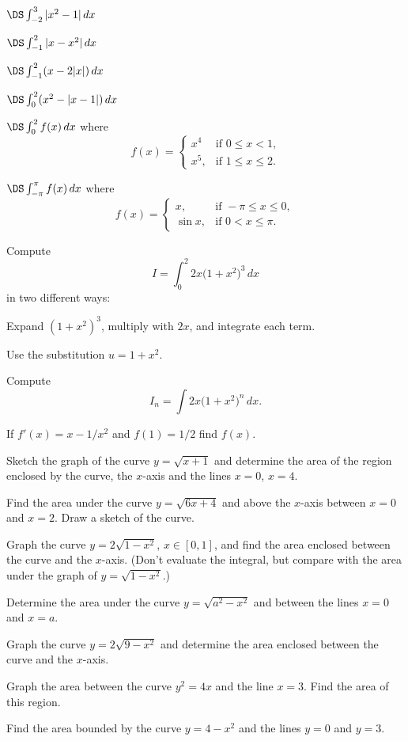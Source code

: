 \begin{multicols}{2}
\problem $\DS \int^3_{-2} |x^2-1| \,dx$

\problem $\DS \int^2_{-1} |x-x^2| \,dx$

\problem $\DS \int^2_{-1} (x-2|x|) \,dx$

\problem $\DS \int^2_{0} (x^2-|x-1|) \,dx$

\problem $\DS \int^2_{0} f(x) \,dx$ where 
\[
f(x) =
\begin{cases}
  x^4 &\text{if $0\le x<1$,}\\
  x^5,&\text{if $1\le x\le 2$}.
\end{cases}
\]

\problem $\DS \int^\pi_{-\pi} f(x) \,dx$ where
\[
f(x) =
\begin{cases}
  x, & \text{if }-\pi\le x\le 0,\\
  \sin x, &\text{if }0< x\le \pi.
\end{cases}
\]

\problem Compute
\[
I = \int _0^2 2x \bigl(1+x^2\bigr)^3\, dx
\]
in two different ways:

\subprob Expand $(1+x^2)^3$, multiply with $2x$, and integrate each term.

\subprob Use the substitution $u=1+x^2$.

\problem Compute
\[
I_n = \int 2x \bigl(1+x^2\bigr)^n\, dx.
\]

\problem If $f'(x)=x-1/x^2$ and $f(1)=1/2$ find $f(x)$.

\problem Sketch the graph of the curve $y=\sqrt{x+1}$ and determine the area of
the region enclosed by the curve, the $x$-axis and the lines $x=0$,
$x=4$.

\problem Find the area under the curve $y=\sqrt{6x+4}$ and above the $x$-axis
between $x=0$ and $x=2$.  Draw a sketch of the curve.

\problem Graph the curve $y=2\sqrt{1-x^2}$, $x\in [0,1]$, and find the area
enclosed between the curve and the $x$-axis.  (Don't evaluate the
integral, but compare with the area under the graph of
$y=\sqrt{1-x^2}$.)

\problem Determine the area under the curve $y=\sqrt{a^2-x^2}$ and between the
lines $x=0$ and $x=a$.

\problem Graph the curve $y=2\sqrt{9-x^2}$ and determine the area enclosed
between the curve and the $x$-axis.

\problem Graph the area between the curve $y^2=4x$ and the line $x=3$.  Find the
area of this region.

\problem Find the area bounded by the curve $y=4-x^2$ and the lines $y=0$ and
$y=3$.


\end{multicols}
